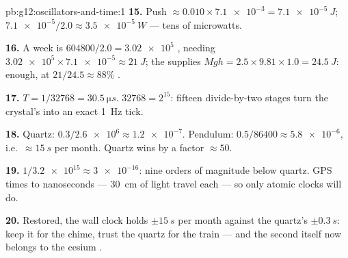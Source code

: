 \begin{solution}{pb:g12:oscillators-and-time:1}
\textbf{15.} Push $\approx 0.010 \times \num{7.1e-3} =
\qty{7.1e-5}{J}$;  $\num{7.1e-5}/2.0 \approx \qty{3.5e-5}{W}$
--- tens of microwatts.

\textbf{16.} A week is $604800/2.0 = \num{3.02e5}$ , needing
$\num{3.02e5} \times \num{7.1e-5} \approx \qty{21}{J}$; the 
supplies $Mgh = 2.5 \times 9.81 \times 1.0 = \qty{24.5}{J}$: enough,
at $21/24.5 \approx 88\%$ .

\textbf{17.} $T = 1/\num{32768} = \qty{30.5}{\micro s}$. $\num{32768}
= 2^{15}$: fifteen divide-by-two stages turn the crystal's 
into an exact \qty{1}{Hz} tick.

\textbf{18.} Quartz: $0.3/\num{2.6e6} \approx \num{1.2e-7}$.
Pendulum: $0.5/86400 \approx \num{5.8e-6}$, i.e.\ $\approx
\qty{15}{s}$ per month. Quartz wins by a factor $\approx 50$.

\textbf{19.} $1/\num{3.2e15} \approx \num{3e-16}$: nine orders of
magnitude below quartz. GPS times  to nanoseconds ---
\qty{30}{cm} of light travel each --- so only atomic clocks will do.

\textbf{20.} Restored, the wall clock holds $\pm\qty{15}{s}$ per
month against the quartz's $\pm\qty{0.3}{s}$: keep it for the chime,
trust the quartz for the train --- and the second itself now belongs
to the cesium .
\end{solution}
